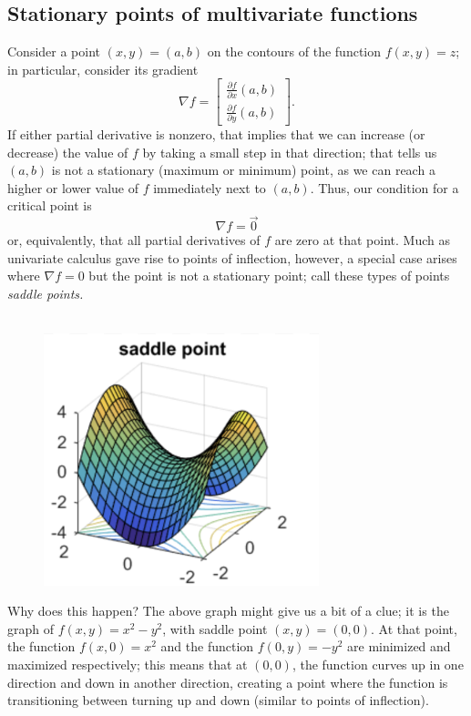 \documentclass{article}
\begin{document}
\subsection{Stationary points of multivariate functions}
Consider a point $(x,y)=(a,b)$ on the contours of the function $f(x,y)=z$; in particular, consider its gradient 
\begin{equation*}
    \nabla f = \begin{bmatrix}
        \frac{\partial f}{\partial x} (a,b) \\
        \frac{\partial f}{\partial y} (a,b)
    \end{bmatrix}.
\end{equation*}
If either partial derivative is nonzero, that implies that we can increase (or decrease) the value of $f$ by taking a small step in that direction; that tells us $(a,b)$ is not a stationary (maximum or minimum) point, as we can reach a higher or lower value of $f$ immediately next to $(a,b)$. Thus, our condition for a critical point is 
\begin{equation*}
    \nabla f = \vec{0}
\end{equation*}
or, equivalently, that all partial derivatives of $f$ are zero at that point. Much as univariate calculus gave rise to points of inflection, however, a special case arises where $\nabla f = 0$ but the point is not a stationary point; call these types of points \it saddle points.\normalfont \\ \\
\begin{figure}[h]
    \centering
    \includegraphics[width=8cm]{DE-ch4-saddlepoint.png}
\end{figure}
Why does this happen? The above graph might give us a bit of a clue; it is the graph of $f(x,y)=x^2-y^2$, with saddle point $(x,y)=(0,0)$. At that point, the function $f(x,0)=x^2$ and the function $f(0,y)=-y^2$ are minimized and maximized respectively; this means that at $(0,0)$, the function curves up in one direction and down in another direction, creating a point where the function is transitioning between turning up and down (similar to points of inflection).
\end{document}
